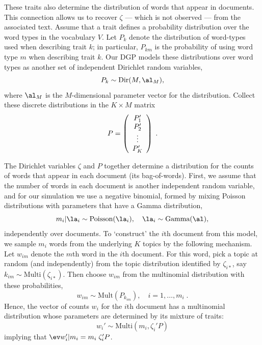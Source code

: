 \documentclass[12pt]{article}
\begin{document}
These traits also determine the distribution of words that appear in documents.  This connection allows us to recover $\zeta$ --- which is not observed --- from the associated text.  Assume that a trait defines a probability distribution over the word types in the vocabulary $V$.  Let $P_k$ denote the distribution of word-types used when describing trait $k$; in particular, $P_{km}$ is the probability of using word type $m$ when describing trait $k$.  Our DGP models these distributions over word types as another set of independent Dirichlet random variables,
 \begin{equation}
   P_k \sim \mbox{Dir}(M, \al_M),
   \label{eq:Pk}
 \end{equation}
where $\al_M$ is the $M$-dimensional parameter vector for the distribution.
 Collect these discrete
 distributions in the $K \times M$ matrix
 \begin{equation}
    P = \left(  \begin{array}{c} 
                    P_1' \cr P_2' \cr  \vdots \cr P_K'
                \end{array}
        \right) \;.
 \label{eq:P}
 \end{equation}
 
 
The Dirichlet variables $\zeta$ and $P$ together determine a distribution for the counts of words that appear in each document (its bag-of-words).  First, we assume that the number of words in each document is another independent random variable, and for our simulation we use a negative binomial, formed by mixing Poisson distributions with parameters that have a Gamma distribution,
\begin{equation}
  m_i|\la_i \sim \mbox{Poisson}(\la_i), \quad \la_i \sim \mbox{Gamma}(\al),
\end{equation}
independently over documents.  To `construct' the $i$th document from this model, we sample $m_i$ words from the underlying $K$ topics by the following mechanism.  Let $w_{im}$ denote the $m$th word in the $i$th document.  For this word, pick a topic at random (and independently) from the topic distribution identified by $\zeta_{i*}$, say $k_{im} \sim \mbox{Multi}(\zeta_{i*})$.  Then choose $w_{im}$ from the multinomial distribution with these probabilities, 
\begin{equation}
  w_{im} \sim \mbox{Mult}(P_{k_{im}}), \quad i = 1,\ldots,m_i \;.
  \label{eq:wim}
\end{equation}
Hence, the vector of counts $w_i$ for the $i$th document has a multinomial distribution whose parameters are determined by its mixture of traits:
 \begin{equation}
   w_i' \sim \mbox{Multi}(m_i, \zeta_i' P)   
 \label{eq:di}
 \end{equation}
 implying that $\ev w_i' | m_i = m_i \; \zeta_i'P$.  
 
\end{document}
